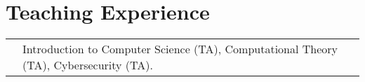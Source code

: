 \documentclass[a4paper,10pt]{article} %
\begin{document}

\section{Teaching Experience}

\begin{tabular}{ll}
 & Introduction to Computer Science (TA), Computational Theory (TA), Cybersecurity (TA).\\

\end{tabular}

\end{document}
